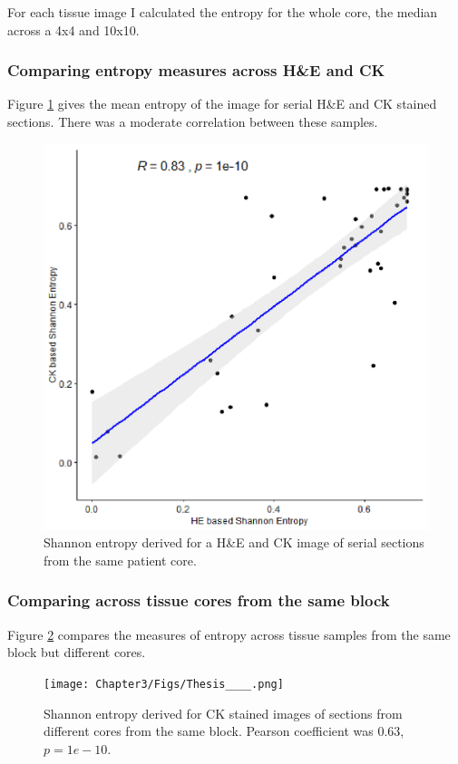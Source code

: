 For each tissue image I calculated the entropy for the whole core, the median across a 4x4 and 10x10.


\subsubsection{Comparing entropy measures across H\&E and CK}
Figure \ref{fig:entropy} gives the mean entropy of the image for serial H\&E and CK stained sections. There was a moderate correlation between these samples. 

\begin{figure}
    \centering
    \includegraphics{Chapter3/Figs/Thesis-06.png}
    \caption{Shannon entropy derived for a H\&E and CK image of serial sections from the same patient core.}
    \label{fig:entropy}
\end{figure}

\subsubsection{Comparing across tissue cores from the same block}
Figure \ref{fig:entropy_block} compares the measures of entropy across tissue samples from the same block but different cores. 
\begin{figure}
    \centering
    \texttt{[image: Chapter3/Figs/Thesis\_\_\_\_.png]}
    \caption{Shannon entropy derived for CK stained images of sections from different cores from the same block. Pearson coefficient was 0.63, $p=1e-10$.}
    \label{fig:entropy_block}
\end{figure}


